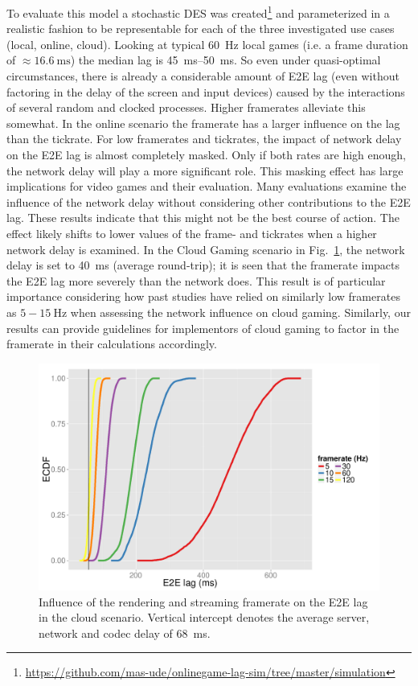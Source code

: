 To evaluate this model a stochastic \gls{DES} was created\footnote{\url{https://github.com/mas-ude/onlinegame-lag-sim/tree/master/simulation}} and parameterized in a realistic fashion to be representable for each of the three investigated use cases (local, online, cloud). Looking at typical \SI{60}{\hertz} local games (i.e. a frame duration of $\approx \SI{16.6}{\milli\second}$) the median lag is \SIrange{45}{50}{\milli\second}. So even under quasi-optimal circumstances, there is already a considerable amount of \gls{E2E} lag (even without factoring in the delay of the screen and input devices) caused by the interactions of several random and clocked processes. Higher framerates alleviate this somewhat. In the online scenario the framerate has a larger influence on the lag than the tickrate. For low framerates and tickrates, the impact of network delay on the \gls{E2E} lag is almost completely masked. Only if both rates are high enough, the network delay will play a more significant role. This masking effect has large implications for video games and their evaluation. Many evaluations examine the influence of the network delay without considering other contributions to the \gls{E2E} lag. These results indicate that this might not be the best course of action. The effect likely shifts to lower values of the frame- and tickrates when a higher network delay is examined. In the Cloud Gaming scenario in Fig.~\ref{fig:cloud-e2e-delay-sim}, the network delay is set to \SI{40}{\milli\second} (average round-trip); it is seen that the framerate impacts the \gls{E2E} lag more severely than the network does. This result is of particular importance considering how past studies have relied on similarly low framerates as $5-\SI{15}{\hertz}$ when assessing the network influence on cloud gaming. Similarly, our results can provide guidelines for implementors of cloud gaming to factor in the framerate in their calculations accordingly.

\begin{figure}[!t]
	\centering
	\includegraphics[width=1.0\columnwidth]{../../simulation/visualization/cloudgaming-lag-cdf.pdf}
	\caption{Influence of the rendering and streaming framerate on the \gls{E2E} lag in the cloud scenario. Vertical intercept denotes the average server, network and codec delay of \SI{68}{\milli\second}.}
\label{fig:cloud-e2e-delay-sim}
\end{figure}


